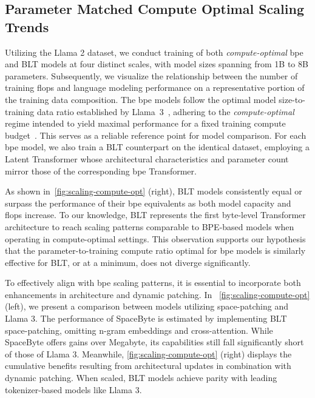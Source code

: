 \subsection{Parameter Matched Compute Optimal Scaling Trends}
\label{section:parameter-matched-scaling}
Utilizing the Llama 2 dataset, we conduct training of both \textit{compute-optimal} bpe and {\textsc BLT} models at four distinct scales, with model sizes spanning from 1B to 8B parameters. Subsequently, we visualize the relationship between the number of training flops and language modeling performance on a representative portion of the training data composition. The bpe models follow the optimal model size-to-training data ratio established by Llama~3~\citep{dubey2024llama}, adhering to the \textit{compute-optimal} regime intended to yield maximal performance for a fixed training compute budget~\citep{hoffmann2022training}. This serves as a reliable reference point for model comparison. For each bpe model, we also train a {\textsc BLT} counterpart on the identical dataset, employing a Latent Transformer whose architectural characteristics and parameter count mirror those of the corresponding bpe Transformer.

As shown in~\autoref{fig:scaling-compute-opt} (right), {\textsc BLT} models consistently equal or surpass the performance of their bpe equivalents as both model capacity and flops increase. To our knowledge, {\textsc BLT} represents the first byte-level Transformer architecture to reach scaling patterns comparable to BPE-based models when operating in compute-optimal settings. This observation supports our hypothesis that the parameter-to-training compute ratio optimal for bpe models is similarly effective for {\textsc BLT}, or at a minimum, does not diverge significantly.

To effectively align with bpe scaling patterns, it is essential to incorporate both enhancements in architecture and dynamic patching. In ~\autoref{fig:scaling-compute-opt} (left), we present a comparison between models utilizing space-patching and Llama 3. The performance of SpaceByte \citep{slagle2024spacebyte} is estimated by implementing {\textsc BLT} space-patching, omitting n-gram embeddings and cross-attention. While SpaceByte offers gains over Megabyte, its capabilities still fall significantly short of those of Llama 3. Meanwhile, \autoref{fig:scaling-compute-opt} (right) displays the cumulative benefits resulting from architectural updates in combination with dynamic patching. When scaled, {\textsc BLT} models achieve parity with leading tokenizer-based models like Llama 3.

